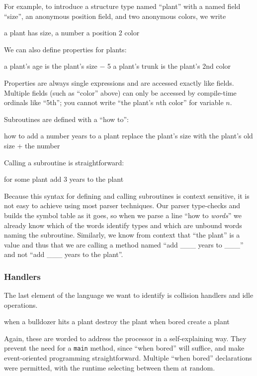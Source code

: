 \documentclass{sig-alternate}
\newcommand{\INDSTATE}[1][1]{\STATE\hspace{#1\algorithmicindent}}
\newenvironment{snippet}{\begin{algorithmic}\sf}{\end{algorithmic}}
\newcommand{\code}[1]{``\textsf{#1}''}
\begin{document}
For example, to introduce a structure type named ``plant''
with a named field ``size'', an anonymous position field, and two anonymous colors,
we write
\begin{snippet}
\STATE a plant has
\INDSTATE size, a number
\INDSTATE a position
\INDSTATE 2 color
\end{snippet}
We can also define properties for plants:
\begin{snippet}
\STATE a plant's age is the plant's size $-$ 5
\STATE a plant's trunk is the plant's 2nd color
\end{snippet}
Properties are always single expressions and are accessed exactly like fields.
Multiple fields (such as \code{color} above) can only be accessed by compile-time ordinals like \code{5th};
you cannot write \code{the plant's $n$th color} for variable $n$.

Subroutines are defined with a ``how to'':
\begin{snippet}
\STATE how to add a number years to a plant
\INDSTATE replace the plant's size with the plant's old size + the number
\end{snippet}
Calling a subroutine is straightforward:
\begin{snippet}
\STATE for some plant
\INDSTATE add 3 years to the plant
\end{snippet}
Because this syntax for defining and calling subroutines
is context sensitive, it is not easy to achieve using most parser techniques.
Our parser type-checks and builds the symbol table as it goes,
so when we parse a line \code{how to {\it words}}
we already know which of the words identify types and which are unbound words naming the subroutine.
Similarly, we know from context that \code{the plant} is a value
and thus that we are calling a method named ``add \_\_\_ years to \_\_\_'' and not ``add \_\_\_ years to the plant''.

\subsubsection{Handlers}
The last element of the language we want to identify
is collision handlers and idle operations.
\begin{snippet}
\STATE when a bulldozer hits a plant
\INDSTATE destroy the plant
\STATE when bored
\INDSTATE create a plant
\end{snippet}
Again, these are worded to address the processor in a self-explaining way.
They prevent the need for a \texttt{main} method, since \code{when bored} will suffice,
and make event-oriented programming straightforward.
Multiple \code{when bored} declarations were permitted,
with the runtime selecting between them at random.
\end{document}

